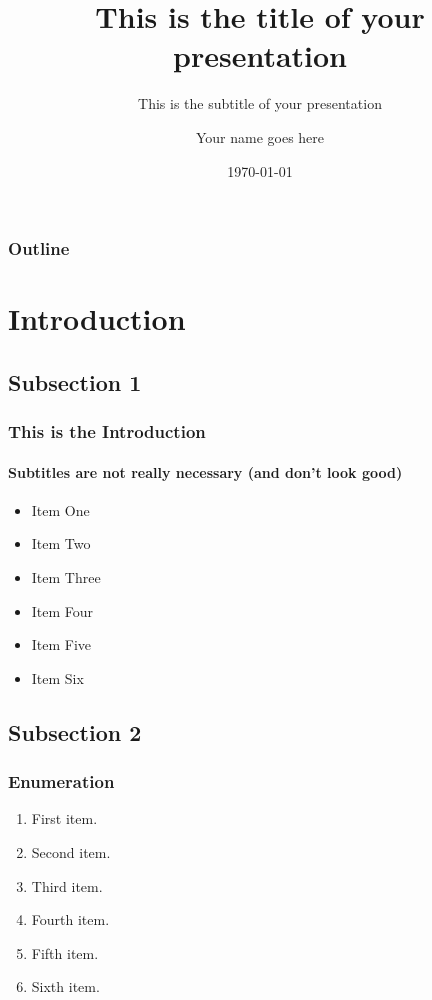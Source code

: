 \documentclass{beamer}
\title[Your shorttitle]{This is the title of your presentation}
\subtitle{This is the subtitle of your presentation}
\author[Your shortname]{Your name goes here}
\institute{DIW Berlin Graduate Center}
\date{\today}
\begin{document}
\begin{frame}[plain] 
\titlepage
\end{frame}



\begin{frame}
\frametitle{Outline}
\tableofcontents 
\end{frame}

 
\section{Introduction}
\subsection{Subsection 1}
\begin{frame} 
\frametitle{This is the Introduction}
\framesubtitle{Subtitles are not really necessary (and don't look good)}
\begin{itemize}
  \item Item One \newline
  \item Item Two \newline
  \item Item Three \newline
  \item Item Four \newline
  \item Item Five \newline
  \item Item Six
\end{itemize}
\end{frame}



\subsection{Subsection 2}
\begin{frame}
\frametitle{Enumeration}
  \begin{enumerate}
    \item First item. \newline
    \item Second item. \newline 
    \item Third item. \newline
    \item Fourth item. \newline
    \item Fifth item. \newline 
    \item Sixth item. \newline
  \end{enumerate}
\end{frame} 
\end{document}
